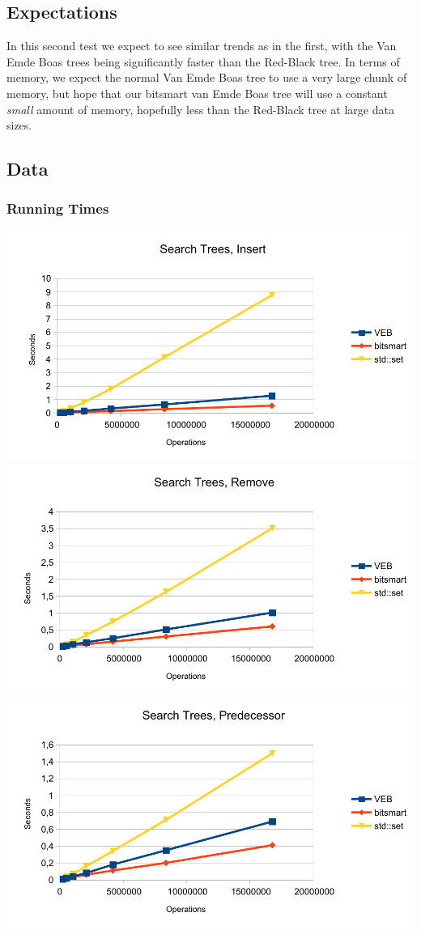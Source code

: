 \subsection{Expectations}

In this second test we expect to see similar trends as in the first, with the Van Emde Boas trees being significantly faster than the Red-Black tree. In terms of memory, we expect the normal Van Emde Boas tree to use a very large chunk of memory, but hope that our bitsmart van Emde Boas tree will use a constant \textit{small} amount of memory, hopefully less than the Red-Black tree at large data sizes.

\subsection{Data}
\subsubsection{Running Times}
\includegraphics[width=\textwidth]{graphs/st_insert.pdf}
\includegraphics[width=\textwidth]{graphs/st_remove.pdf}
\includegraphics[width=\textwidth]{graphs/st_predecessor.pdf}
